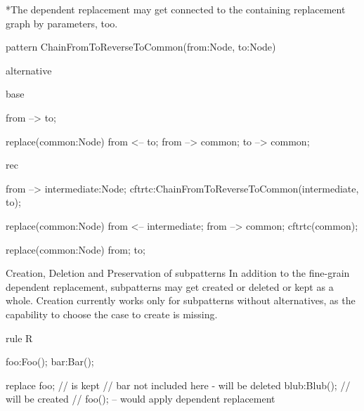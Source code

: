 *The dependent replacement may get connected to the containing replacement
graph by parameters, too.

\begin{example}
  \begin{grgen}
pattern ChainFromToReverseToCommon(from:Node, to:Node) {
  alternative {
    base {
      from --> to;

      replace(common:Node) {
        from <-- to;
        from --> common;
        to --> common;
      }
    }
    rec {
      from --> intermediate:Node;
      cftrtc:ChainFromToReverseToCommon(intermediate, to);

      replace(common:Node) {
        from <-- intermediate;
        from --> common;
        cftrtc(common);
      }
    }
  }

  replace(common:Node) {
    from; to;
  }
}
  \end{grgen}
\end{example}

Creation, Deletion and Preservation of subpatterns
In addition to the fine-grain dependent replacement, 
subpatterns may get created or deleted or kept as a whole.
Creation currently works only for subpatterns without alternatives,
as the capability to choose the case to create is missing.

\begin{example}
  \begin{grgen}
rule R {
  foo:Foo();
  bar:Bar();

  replace {
    foo; // is kept
    // bar not included here - will be deleted
    blub:Blub(); // will be created
    // foo(); -- would apply dependent replacement
  }
}
  \end{grgen}
\end{example}
